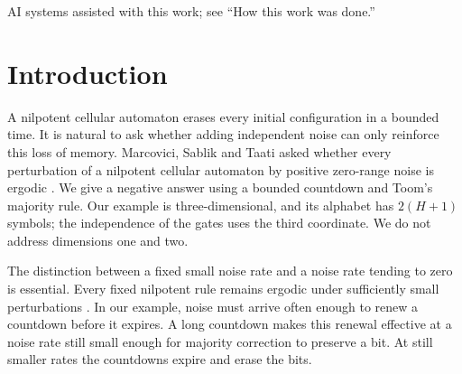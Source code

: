 \documentclass[11pt]{article}
\theoremstyle{plain}
\theoremstyle{definition}
\theoremstyle{remark}
\newcommand{\Z}{\mathbb Z}
\newcommand{\eps}{\varepsilon}
\begin{document}
\begin{abstract}
Erasure in two steps already suffices, while erasure in one step forces ergodicity under every zero-range noise. We give a four-symbol cellular automaton $F$ on $\Z^3$ with $F\circ F$ constant whose uniform replacement perturbation has two translation-invariant stationary laws at every rate in $[2^{-44},2^{-42}]$ and is uniformly exponentially ergodic at sufficiently small and sufficiently large rates. Each site reads a seed, the word of $2^{51}$ auxiliary symbols above it, which every deterministic update resets to zero. Exact rational seed partitions give a compiler: for fixed rationals $0<\eps<2\rho$, it maps every attractive binary probabilistic cellular automaton on $\Z^d$ with rational transition probabilities in $[\rho,1-\rho]$ computably to a cellular automaton on $\Z^{d+1}$, nilpotent in two steps, whose uniform replacement perturbation at rate $\eps$ is ergodic, uniformly exponentially ergodic or has two translation-invariant stationary laws exactly when the original automaton has that property.
\end{abstract}
\begin{center}\small AI systems assisted with this work; see ``How this work was done.''\end{center}

\section{Introduction}

A nilpotent cellular automaton erases every initial configuration in a bounded time. It is natural to ask whether adding independent noise can only reinforce this loss of memory. Marcovici, Sablik and Taati asked whether every perturbation of a nilpotent cellular automaton by positive zero-range noise is ergodic \cite[Problem~6.5]{MST19}. We give a negative answer using a bounded countdown and Toom's majority rule. Our example is three-dimensional, and its alphabet has $2(H+1)$ symbols; the independence of the gates uses the third coordinate. We do not address dimensions one and two.

The distinction between a fixed small noise rate and a noise rate tending to zero is essential. Every fixed nilpotent rule remains ergodic under sufficiently small perturbations \cite[Theorem~3.9]{MST19}. In our example, noise must arrive often enough to renew a countdown before it expires. A long countdown makes this renewal effective at a noise rate still small enough for majority correction to preserve a bit. At still smaller rates the countdowns expire and erase the bits.
\end{document}

